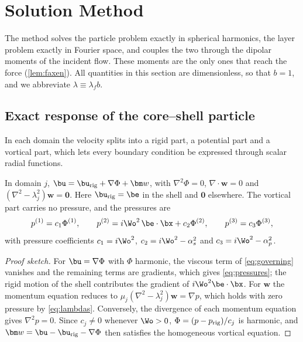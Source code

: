 \section{Solution Method}\label{sec:analysis}

The method solves the particle problem exactly in spherical harmonics, the layer problem exactly in Fourier space, and
couples the two through the dipolar moments of the incident flow. These moments are the only ones that reach the
force (\cref{lem:faxen}). All quantities in this section are dimensionless, so that $b=1$, and we abbreviate
$\lambda\equiv\lambda_fb$.

\subsection{Exact response of the core--shell particle}\label{sec:sphere}
In each domain the velocity splits into a rigid part, a potential part and a vortical part, which lets every boundary
condition be expressed through scalar radial functions.

\begin{lemma}\label{lem:decomp}
In domain $j$, $\bu=\bu_{\rm rig}+\nabla\Phi+\bm w$, with $\nabla^2\Phi=0$, $\nabla\cdot\bm w=0$ and
$(\nabla^2-\lambda_j^2)\bm w=\bm 0$. Here $\bu_{\rm rig}=\be$ in the shell and $\bm 0$ elsewhere. The vortical part
carries no pressure, and the pressures are
\begin{equation}
  p^{(1)}=c_1\Phi^{(1)},\qquad p^{(2)}=i\Wo^2\,\be\cdot\bx+c_2\Phi^{(2)},\qquad p^{(3)}=c_3\Phi^{(3)},
  \label{eq:pressures}
\end{equation}
with pressure coefficients $c_1=i\Wo^2$, $c_2=i\Wo^2-\alpha_s^2$ and $c_3=i\Wo^2-\alpha_p^2$.
\end{lemma}
\begin{proof}[Proof sketch]
For $\bu=\nabla\Phi$ with $\Phi$ harmonic, the viscous term of \cref{eq:governing} vanishes and the remaining terms are
gradients, which gives \cref{eq:pressures}; the rigid motion of the shell contributes the gradient of
$i\Wo^2\be\cdot\bx$. For $\bm w$ the momentum equation reduces to $\mu_j(\nabla^2-\lambda_j^2)\bm w=\nabla p$, which
holds with zero pressure by \cref{eq:lambdas}. Conversely, the divergence of each momentum equation gives
$\nabla^2p=0$. Since $c_j\neq0$ whenever $\Wo>0$, $\Phi=(p-p_{\rm rig})/c_j$ is harmonic, and
$\bm w=\bu-\bu_{\rm rig}-\nabla\Phi$ then satisfies the homogeneous vortical equation.
\end{proof}

